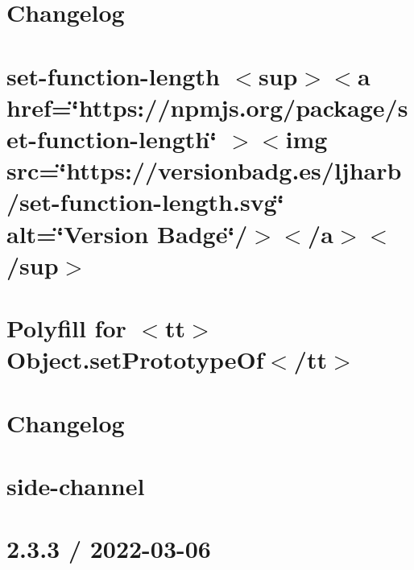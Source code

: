 \documentclass[twoside]{book}
\newcommand{\+}{\discretionary{\mbox{\scriptsize$\hookleftarrow$}}{}{}}
\begin{document}
\chapter{Changelog}
\label{md_src_nodejs_node_modules_set_function_length_CHANGELOG}

\chapter{set-\/function-\/length \texorpdfstring{$<$}{<}sup\texorpdfstring{$>$}{>}\texorpdfstring{$<$}{<}a href=\char`\"{}https\+://npmjs.\+org/package/set-\/function-\/length\char`\"{} \texorpdfstring{$>$}{>}\texorpdfstring{$<$}{<}img src=\char`\"{}https\+://versionbadg.\+es/ljharb/set-\/function-\/length.\+svg\char`\"{} alt=\char`\"{}\+Version Badge\char`\"{}/\texorpdfstring{$>$}{>}\texorpdfstring{$<$}{<}/a\texorpdfstring{$>$}{>}\texorpdfstring{$<$}{<}/sup\texorpdfstring{$>$}{>}}
\label{md_src_nodejs_node_modules_set_function_length_README}

\chapter{Polyfill for \texorpdfstring{$<$}{<}tt\texorpdfstring{$>$}{>}Object.\+set\+Prototype\+Of\texorpdfstring{$<$}{<}/tt\texorpdfstring{$>$}{>}}
\label{md_src_nodejs_node_modules_setprototypeof_README}

\chapter{Changelog}
\label{md_src_nodejs_node_modules_side_channel_CHANGELOG}

\chapter{side-\/channel}
\label{md_src_nodejs_node_modules_side_channel_README}

\chapter{2.3.3 / 2022-\/03-\/06}
\label{md_src_nodejs_node_modules_sqlstring_HISTORY}

\end{document}
